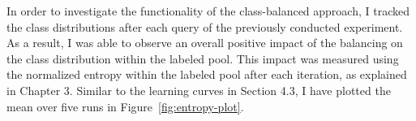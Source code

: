 \documentclass[english,bachelor,ul]{webisthesis} %
\begin{document}
In order to investigate the functionality of the class-balanced approach, I tracked the class distributions after each query of the previously conducted experiment. As a result, I was able to observe an overall positive impact of the balancing on the class distribution within the labeled pool. This impact was measured using the normalized entropy within the labeled pool after each iteration, as explained in Chapter 3. Similar to the learning curves in Section 4.3, I have plotted the mean over five runs in Figure~\ref{fig:entropy-plot}. 

\end{document}
